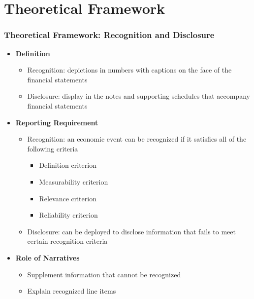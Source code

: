 \documentclass{beamer}
\begin{document}
\section{Theoretical Framework}
\begin{frame}
\frametitle{Theoretical Framework: Recognition and Disclosure}
\begin{itemize}
\item \textbf{Definition \citep{schipperRequiredDisclosuresFinancial2007}}
	
	\begin{itemize}
		\item Recognition: depictions in numbers with captions on the face of the financial statements
		\item Disclosure: display in the notes and supporting schedules that accompany financial statements
	\end{itemize}

\item \textbf{Reporting Requirement \citep{fasbStatementFinancialAccounting1984}}

	\begin{itemize}
		\item Recognition: an economic event can be recognized if it satisfies all of the following criteria
		\begin{itemize}
			\item Definition criterion
			\item Measurability criterion
			\item Relevance criterion
			\item Reliability criterion
		\end{itemize}
		\item Disclosure: can be deployed to disclose information that fails to meet certain recognition criteria
	\end{itemize}

\item \textbf{Role of Narratives} 

	\begin{itemize}
		\item Supplement information that cannot be recognized
		\item Explain recognized line items
	\end{itemize}

\end{itemize}
\end{frame}
\end{document}
